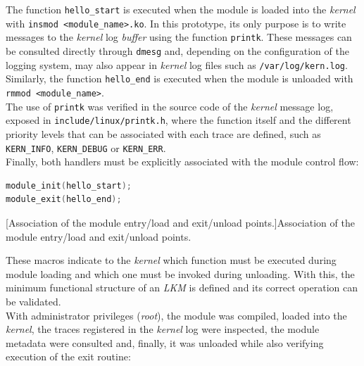 The function \verb|hello_start| is executed when the module is loaded into the \textit{kernel} with \verb|insmod <module_name>.ko|. In this prototype, its only purpose is to write messages to the \textit{kernel} log \textit{buffer} using the function \verb|printk|.
These messages can be consulted directly through \verb|dmesg| and, depending on the configuration of the logging system, may also appear in \textit{kernel} log files such as \texttt{/var/log/kern.log}.
Similarly, the function \verb|hello_end| is executed when the module is unloaded with \verb|rmmod <module_name>|.\\
The use of \verb|printk| was verified in the source code of the \textit{kernel} message log, exposed in \texttt{include/linux/printk.h}, where the function itself and the different priority levels that can be associated with each trace are defined, such as \verb|KERN_INFO|, \verb|KERN_DEBUG| or \verb|KERN_ERR|.\\

Finally, both handlers must be explicitly associated with the module control flow:

\begin{lstlisting}[language=C]
module_init(hello_start);
module_exit(hello_end);
\end{lstlisting}
\captionsetup{type=code,justification=centering,singlelinecheck=false}
[Association of the module entry/load and exit/unload points.]{Association of the module entry/load and exit/unload points.}
\label{cod:hello_module_init}
\vspace{\baselineskip}

These macros indicate to the \textit{kernel} which function must be executed during module loading and which one must be invoked during unloading.
With this, the minimum functional structure of an \textit{LKM} is defined and its correct operation can be validated.\\

With administrator privileges (\textit{root}), the module was compiled, loaded into the \textit{kernel}, the traces registered in the \textit{kernel} log were inspected, the module metadata were consulted and, finally, it was unloaded while also verifying execution of the exit routine:

